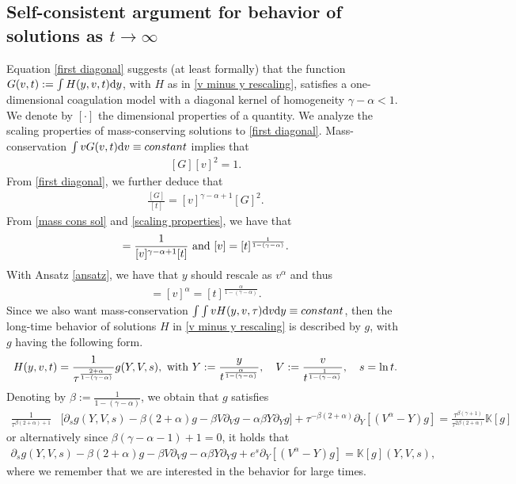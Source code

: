\documentclass[11pt]{article}
\numberwithin{equation}{section}
\newcommand{\der}{\textup{d}}
\begin{document}
\subsection{Self-consistent argument for behavior of solutions as $t\rightarrow\infty$}
Equation \eqref{first diagonal} suggests (at least formally) that the function $G(v,t):=\int H(y,v,t)\der y$, with $H$ as in \eqref{v minus y rescaling}, satisfies a one-dimensional 
 coagulation model with a diagonal kernel of homogeneity $\gamma-\alpha<1$. We denote by  $[\cdot]$ the dimensional properties of a quantity. We analyze the scaling properties of mass-conserving solutions to \eqref{first diagonal}. Mass-conservation $\int  v G(v,t)\der v \equiv constant$ implies that
 \begin{align}\label{mass cons sol}
     [G][v]^{2}=1.
 \end{align}
 From \eqref{first diagonal}, we further deduce that
\begin{align}\label{scaling properties}
\frac{[G]}{[t]}=[v]^{\gamma-\alpha+1}[G]^{2}.
\end{align}
From \eqref{mass cons sol} and \eqref{scaling properties}, we have that 
 \begin{align*}
     [G]=\frac{1}{[v]^{\gamma-\alpha+1}[t]}\textup{ and } [v]=[t]^{\frac{1}{1-(\gamma-\alpha)}}.
 \end{align*} With Ansatz \ref{ansatz}, we have that $y$ should rescale as $v^{\alpha}$ and thus
 \begin{align*}
     [y]=[v]^{\alpha}=[t]^{\frac{\alpha}{1-(\gamma-\alpha)}}.
 \end{align*} Since we also want mass-conservation $\int \int v H(y,v,\tau)\der v \der y \equiv constant$, then the long-time behavior of solutions $H$ in \eqref{v minus y rescaling} is described by $g$, with $g$ having the following form.
\begin{align*}
    H(y,v,t)=\frac{1}{\tau^{\frac{2+\alpha}{1-(\gamma-\alpha)}}}g(Y,V, s), \textup{ with } Y:=\frac{y}{t^{\frac{\alpha}{1-(\gamma-\alpha)}}}, \quad V:=\frac{v}{t^{\frac{1}{1-(\gamma-\alpha)}}}, \quad  s=\ln t.
\end{align*}
Denoting by $\beta:=\frac{1}{1-(\gamma-\alpha)}$, we obtain that $g$ satisfies
\begin{align*}
   \frac{1}{\tau^{\beta(2+\alpha)+1}}& \big[\partial_{s}g(Y,V,s)-\beta(2+\alpha)g-\beta V\partial_{V}g-\alpha\beta Y\partial_{Y}g\big]+\tau^{-\beta(2+\alpha)}\partial_{Y}[(V^{\alpha}-Y)g]= \frac{\tau^{\beta(\gamma+1)}}{\tau^{2\beta(2+\alpha)}}\mathbb{K}[g]
\end{align*}
or alternatively since $\beta(\gamma-\alpha-1)+1=0$, it holds that
\begin{align*}
  \partial_{s}g(Y,V,s)-\beta(2+\alpha)g- \beta V\partial_{V}g-\alpha\beta Y\partial_{Y}g + e^{s}\partial_{Y}[(V^{\alpha}-Y)g]=\mathbb{K}[g](Y,V,s),
\end{align*}
where we remember that we are interested in the behavior for large times.
\end{document}
